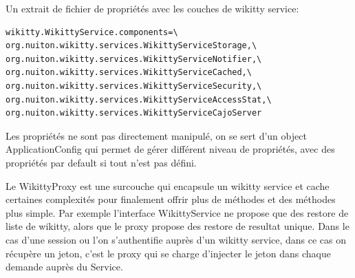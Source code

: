 
Un extrait de fichier de propriétés avec les couches de wikitty service:
\begin{verbatim}
wikitty.WikittyService.components=\
org.nuiton.wikitty.services.WikittyServiceStorage,\
org.nuiton.wikitty.services.WikittyServiceNotifier,\
org.nuiton.wikitty.services.WikittyServiceCached,\
org.nuiton.wikitty.services.WikittyServiceSecurity,\
org.nuiton.wikitty.services.WikittyServiceAccessStat,\
org.nuiton.wikitty.services.WikittyServiceCajoServer
\end{verbatim}

Les propriétés ne sont pas directement manipulé, on se sert d'un object 
ApplicationConfig qui permet de gérer différent niveau de propriétés,
avec des propriétés par default si tout n'est pas défini.

Le WikittyProxy est une surcouche qui encapsule un wikitty service et cache 
certaines complexités pour finalement offrir plus de méthodes et des méthodes 
plus simple. Par exemple l'interface WikittyService ne propose que des 
restore de liste de wikitty, alors que le proxy propose des restore de resultat
unique. Dans le cas d'une session ou l'on s'authentifie auprès d'un wikitty 
service, dans ce cas on récupère un jeton, c'est le proxy qui se charge 
d'injecter le jeton dans chaque demande auprès du Service.


